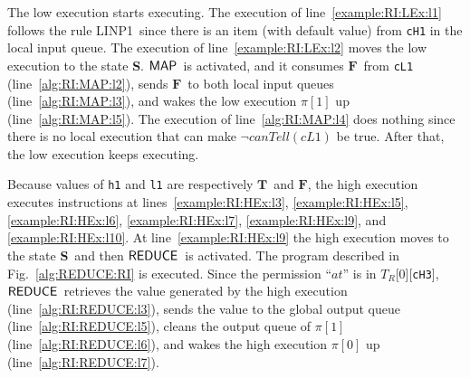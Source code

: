 \documentclass[10pt,a4paper,oneside]{article}
\def\sS{\textbf{S}}
\def\TPV{\ensuremath{T_{R}}}
\def\VTRUE{\ensuremath{\textbf{T}}}
\def\VFALSE{\ensuremath{\textbf{F}}}
\def\sanserif#1{\ensuremath{\sf #1}}
\def\REDUCE{\ensuremath{\sanserif{REDUCE}}}
\def\MAP{\ensuremath{\sanserif{MAP}}}
\def\Prog{\ensuremath{\pi}}
\def\Progl#1{\ensuremath{\Prog[#1]}}
\def\RINPUTYL{LINP1}
\def\NCMAP{\ensuremath{canTell}}
\def\canMap#1{\ensuremath{\NCMAP(#1)}}
\def\task{\ensuremath{a}}
\def\ttell{\ensuremath{t}}
\def\linecode#1{{\texttt{#1}}}
\begin{document}
The low execution starts executing. The execution of line~\ref{example:RI:LEx:l1} follows the rule \RINPUTYL\ since there is an item (with default value) from \linecode{cH1} in the local input queue. The execution of line~\ref{example:RI:LEx:l2} moves the low execution to the state \sS. \MAP\ is activated, and it consumes \VFALSE\ from \linecode{cL1} (line~\ref{alg:RI:MAP:l2}), sends \VFALSE\ to both local input queues (line~\ref{alg:RI:MAP:l3}), and wakes the low execution \Progl{1} up (line~\ref{alg:RI:MAP:l5}). The execution of line~\ref{alg:RI:MAP:l4} does nothing since there is no local execution that can make $\neg\canMap{cL1}$ be true. After that, the low execution keeps executing.

Because values of \linecode{h1} and \linecode{l1} are respectively \VTRUE\ and \VFALSE, the high execution executes instructions at lines~\ref{example:RI:HEx:l3}, \ref{example:RI:HEx:l5}, \ref{example:RI:HEx:l6}, \ref{example:RI:HEx:l7}, \ref{example:RI:HEx:l9}, and \ref{example:RI:HEx:l10}. At line~\ref{example:RI:HEx:l9} the high execution moves to the state \sS\ and then \REDUCE\ is activated. The program described in Fig.~\ref{alg:REDUCE:RI} is executed. Since the permission ``$\task\ttell$'' is in \TPV[0][\linecode{cH3}], \REDUCE\ retrieves the value generated by the high execution (line~\ref{alg:RI:REDUCE:l3}), sends the value to the global output queue (line~\ref{alg:RI:REDUCE:l5}), cleans the output queue of \Progl{1} (line~\ref{alg:RI:REDUCE:l6}), and wakes the high execution \Progl{0} up (line~\ref{alg:RI:REDUCE:l7}).
\end{document}
